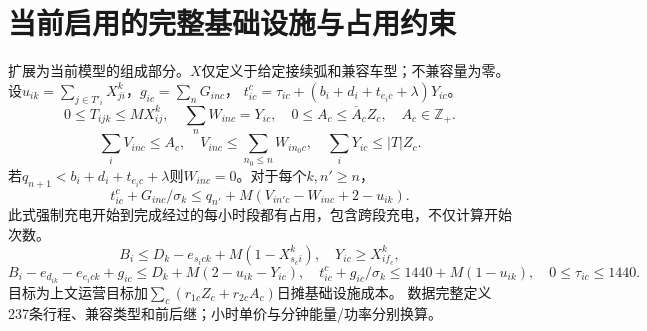 \documentclass[11pt]{ctexart}
\begin{document}
\section*{当前启用的完整基础设施与占用约束}
扩展为当前模型的组成部分。$X$仅定义于给定接续弧和兼容车型；不兼容量为零。
设$u_{ik}=\sum_{j\in T'_i}X^k_{ji}$，$g_{ic}=\sum_nG_{inc}$，
$t^c_{ic}=\tau_{ic}+(b_i+d_i+t_{e_i c}+\lambda)Y_{ic}$。
\[
0\le T_{ijk}\le MX^k_{ij},\quad
\sum_nW_{inc}=Y_{ic},\quad
0\le A_c\le \overline A_cZ_c,\quad A_c\in\mathbb Z_+.
\]
\[
\sum_iV_{inc}\le A_c,\quad V_{inc}\le\sum_{n_0\le n}W_{in_0c},\quad
\sum_iY_{ic}\le|T|Z_c.
\]
若$q_{n+1}<b_i+d_i+t_{e_ic}+\lambda$则$W_{inc}=0$。对于每个$k,n'\ge n$，
\[
t^c_{ic}+G_{inc}/\sigma_k
\le q_{n'}+M(V_{in'c}-W_{inc}+2-u_{ik}).
\]
此式强制充电开始到完成经过的每小时段都有占用，包含跨段充电，不仅计算开始次数。
\[
B_i\le D_k-e_{s_ic k}+M(1-X^k_{s_ci}),\quad Y_{ic}\ge X^k_{if_c},
\]
\[
B_i-e_{d_{ik}}-e_{e_ic k}+g_{ic}\le D_k+M(2-u_{ik}-Y_{ic}),\quad
t^c_{ic}+g_{ic}/\sigma_k\le1440+M(1-u_{ik}),\quad0\le\tau_{ic}\le1440.
\]
目标为上文运营目标加$\sum_c(r_{1c}Z_c+r_{2c}A_c)$日摊基础设施成本。
数据完整定义237条行程、兼容类型和前后继；小时单价与分钟能量/功率分别换算。
\end{document}
